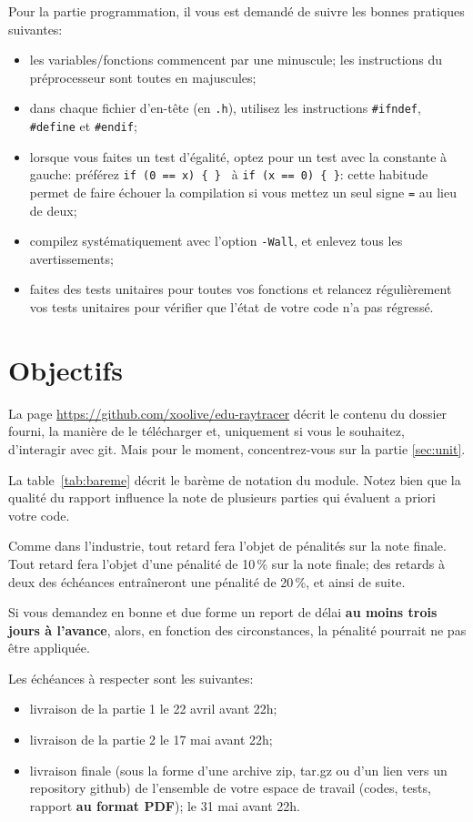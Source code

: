 \documentclass[10pt, a4paper ]{article}
\begin{document}
Pour la partie programmation, il vous est demandé de suivre les bonnes pratiques
suivantes:
\begin{itemize}
    \item les variables/fonctions commencent par une minuscule; les instructions
        du préprocesseur sont toutes en majuscules;
    \item dans chaque fichier d'en-tête (en \texttt{.h}), utilisez les
        instructions \texttt{\#ifndef}, \texttt{\#define} et \texttt{\#endif};
    \item lorsque vous faites un test d'égalité, optez pour un test avec la
        constante à gauche: préférez \texttt{if (0 == x) \{ \} } à
        \texttt{if (x == 0) \{ \}}: cette habitude permet de faire échouer la
        compilation si vous mettez un seul signe \texttt{=} au lieu de deux;
    \item compilez systématiquement avec l'option \texttt{-Wall}, et enlevez
        tous les avertissements;
    \item faites des tests unitaires pour toutes vos fonctions et relancez
        régulièrement vos tests unitaires pour vérifier que l'état de votre code
        n'a pas régressé.
\end{itemize}


\section{Objectifs}

La page \url{https://github.com/xoolive/edu-raytracer} décrit le contenu du
dossier fourni, la manière de le télécharger et, uniquement si vous le
souhaitez, d'interagir avec git. Mais pour le moment, concentrez-vous sur la
partie \ref{sec:unit}.

La table~\ref{tab:bareme} décrit le barème de notation du module. Notez bien que
la qualité du rapport influence la note de plusieurs parties qui évaluent a
priori votre code.

Comme dans l'industrie, tout retard fera l'objet de pénalités sur la note
finale. Tout retard fera l'objet d'une pénalité de 10\,\% sur la note finale;
des retards à deux des échéances entraîneront une pénalité de 20\,\%, et ainsi
de suite.

Si vous demandez en bonne et due forme un report de délai \textbf{au moins trois
jours à l'avance}, alors, en fonction des circonstances, la pénalité pourrait
ne pas être appliquée.

Les échéances à respecter sont les suivantes:
\begin{itemize}
    \item livraison de la partie 1 le 22 avril avant 22h;
    \item livraison de la partie 2 le 17 mai avant 22h;
    \item livraison finale (sous la forme d'une archive zip, tar.gz ou d'un lien
        vers un repository github) de l'ensemble de votre espace de travail
        (codes, tests, rapport \textbf{au format PDF}); le 31 mai avant 22h.
\end{itemize}
\end{document}
